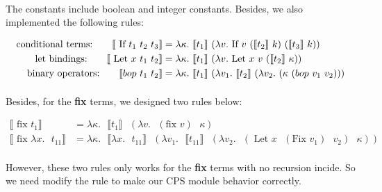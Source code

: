 \documentclass[10pt]{article}
\begin{document}
\paragraph{}
The constants include boolean and integer constants. Besides, we also implemented the following rules:

\begin{align*}
        \text{conditional terms:\quad \quad } \llbracket \text{ If } t_1 \text{ } t_2 \text{ }t_3 \rrbracket & = \lambda \kappa.\text{ }\llbracket t_1 \rrbracket \text{ }(\lambda v.\text{ If } v \text{ }(\llbracket t_2 \rrbracket \text{ }k)\text{ }(\llbracket t_3 \rrbracket \text{ }k))\\
        \text{let bindings:\quad \quad }\llbracket \text{ Let } x\text{ }t_1 \text{ } t_2 \rrbracket & = \lambda \kappa.\text{ }\llbracket t_1 \rrbracket \text{ }(\lambda v.\text{ Let } x \text{ }v\text{ }(\llbracket t_2 \rrbracket \text{ }\kappa))\\
        \text{binary operators:\quad \quad }\llbracket bop\text{ }t_1 \text{ }t_2 \rrbracket &= \lambda \kappa.\text{ }\llbracket t_1 \rrbracket \text{ }(\lambda v_1.\text{ }\llbracket t_2 \rrbracket \text{ }(\lambda v_2.\text{ }(\kappa\text{ }(bop\text{ }v_1\text{ }v_2)))                                                                      
\end{align*}

\paragraph{}
Besides, for the \textbf{fix} terms, we designed two rules below:

\begin{align*}
                \llbracket \text{ fix }t_1 \rrbracket &= \lambda \kappa.\text{ }\llbracket t_1 \rrbracket \text{ }(\lambda v.\text{ }(\text{fix }v)\text{ }\kappa)\\
                \llbracket \text{ fix } \lambda x.\text{ }t_{11} \rrbracket &= \lambda \kappa.\text{ }\llbracket \lambda x.\text{ }t_{11} \rrbracket \text{ }(\lambda v_1.\text{ }\llbracket t_11 \rrbracket \text{ }(\lambda v_2.\text{ }(\text{ Let } x\text{ }(\text{Fix }v_1)\text{ }v_2)\text{ }\kappa))
\end{align*}

\paragraph{}
However, these two rules only works for the \textbf{fix} terms with no recursion incide. So we need modify the rule to make our CPS module behavior correctly.
\end{document}
